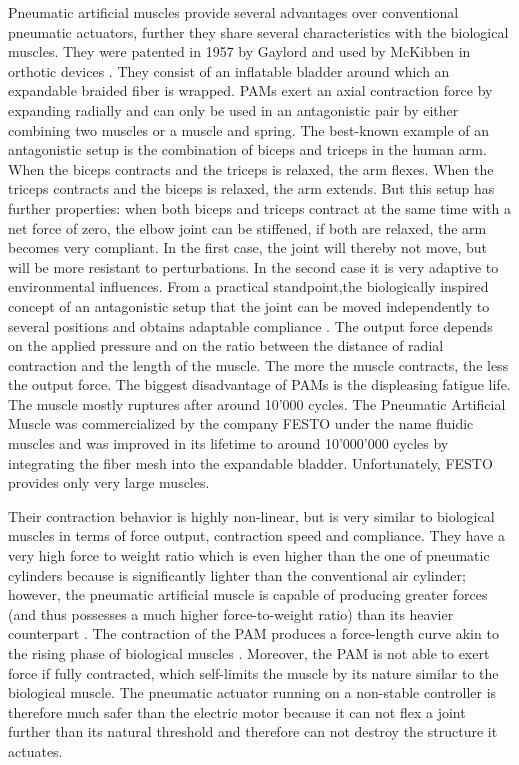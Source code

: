 \documentclass[main]{subfiles}
\begin{document}
Pneumatic artificial muscles provide several advantages over conventional pneumatic actuators, further they share several characteristics with the biological muscles. They were patented in 1957 by Gaylord and used by McKibben in orthotic devices \cite{Nickel1963}. They consist of an inflatable bladder around which an expandable braided fiber is wrapped. PAMs exert an axial contraction force by expanding radially and can only be used in an antagonistic pair by either combining two muscles or a muscle and spring. The best-known example of an antagonistic setup is the combination of biceps and triceps in the human arm. When the biceps contracts and the triceps is relaxed, the arm flexes. When the triceps contracts and the biceps is relaxed, the arm extends. But this setup has further properties:  when both biceps and triceps contract at the same time with a net force of zero, the elbow joint can be stiffened, if both are relaxed, the arm becomes very compliant. In the first case, the joint will thereby not move, but will be more resistant to perturbations. In the second case it is very adaptive to environmental influences. From a practical standpoint,the biologically inspired concept of an antagonistic setup that the joint can be moved independently to several positions and obtains adaptable compliance \cite{VanHam2009}. The output force depends on the applied pressure and on the ratio between the distance of radial contraction and the length of the muscle. The more the muscle contracts, the less the output force. The biggest disadvantage of PAMs is the displeasing fatigue life. The muscle mostly ruptures after around 10'000 cycles. The Pneumatic Artificial Muscle was commercialized by the company FESTO under the name fluidic muscles \cite{fluidic-muscles} and was improved in its lifetime to around 10'000'000 cycles by integrating the fiber mesh into the expandable bladder. Unfortunately, FESTO provides only very large muscles. 

Their contraction behavior is highly non-linear, but is very similar to biological muscles in terms of force output, contraction speed and compliance. They have a very high force to weight ratio which is even higher than the one of pneumatic cylinders because is significantly lighter than the conventional air cylinder; however, the pneumatic artificial muscle is capable of producing greater forces (and thus possesses a much higher force-to-weight ratio) than its heavier counterpart \cite{Lightner2002}. The contraction of the PAM produces a force-length curve akin to the rising phase of biological muscles \cite{Klute1999}. Moreover, the PAM is not able to exert force if fully contracted, which self-limits the muscle by its nature similar to the biological muscle. The pneumatic actuator running on a non-stable controller is therefore much safer than the electric motor because it can not flex a joint further than its natural threshold and therefore can not destroy the structure it actuates.
\end{document}
